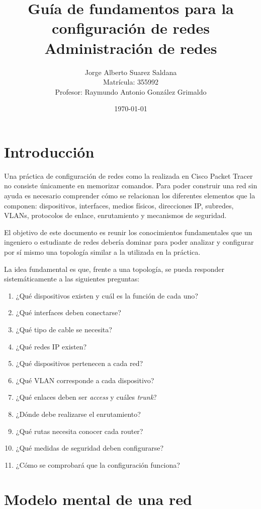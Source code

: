 \documentclass[12pt]{article}
\title{
Guía de fundamentos para la configuración de redes\\[0.5em]
\large Administración de redes
}
\author{
Jorge Alberto Suarez Saldana\\
\small Matrícula: 355992\\
\small Profesor: Raymundo Antonio González Grimaldo
}
\date{\today}
\begin{document}
\maketitle

\tableofcontents
\newpage


\section{Introducción}

Una práctica de configuración de redes como la realizada en Cisco Packet
Tracer no consiste únicamente en memorizar comandos. Para poder construir
una red sin ayuda es necesario comprender cómo se relacionan los diferentes
elementos que la componen: dispositivos, interfaces, medios físicos,
direcciones IP, subredes, VLANs, protocolos de enlace, enrutamiento y
mecanismos de seguridad.

El objetivo de este documento es reunir los conocimientos fundamentales que
un ingeniero o estudiante de redes debería dominar para poder analizar y
configurar por sí mismo una topología similar a la utilizada en la práctica.

La idea fundamental es que, frente a una topología, se pueda responder
sistemáticamente a las siguientes preguntas:

\begin{enumerate}
    \item ¿Qué dispositivos existen y cuál es la función de cada uno?
    \item ¿Qué interfaces deben conectarse?
    \item ¿Qué tipo de cable se necesita?
    \item ¿Qué redes IP existen?
    \item ¿Qué dispositivos pertenecen a cada red?
    \item ¿Qué VLAN corresponde a cada dispositivo?
    \item ¿Qué enlaces deben ser \textit{access} y cuáles \textit{trunk}?
    \item ¿Dónde debe realizarse el enrutamiento?
    \item ¿Qué rutas necesita conocer cada router?
    \item ¿Qué medidas de seguridad deben configurarse?
    \item ¿Cómo se comprobará que la configuración funciona?
\end{enumerate}


\section{Modelo mental de una red}
\end{document}
